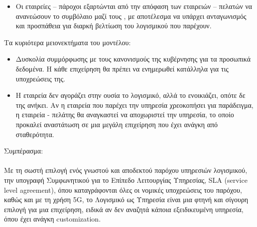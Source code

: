 \documentclass{article}
\begin{document}
\begin{itemize}
     SaaS, μια επιχείρηση έχει την ευκαιρία να αφοσιωθεί σε αυτό που την ενδιαφέρει πιο πολύ, την ποιότητα του προϊόντος της. Το ίδιο βέβαια ισχύει και για τους ιδιώτες. Αύξηση, λοιπόν, της καινοτομίας και της ευκινησίας (agility).
\item Οι εταιρείες – πάροχοι εξαρτώνται από την απόφαση των εταιρειών – πελατών να ανανεώσουν το συμβόλαιο μαζί τους , με αποτέλεσμα να υπάρχει ανταγωνισμός και προσπάθεια για διαρκή βελτίωση του λογισμικού που παρέχουν.
\end{itemize} 
Τα κυριότερα μειονεκτήματα του μοντέλου:
\begin{itemize}
  η χρήση Διαδικτύου, διαφορετικά δεν μπορεί να υπάρξει πρόσβαση στην εφαρμογή . Αντίθετα , με τον παραδοσιακό τρόπο του Λογισμικού ως Προϊόν , σε ορισμένες περιπτώσεις , ήταν εφικτό να γίνεται χρήση της εφαρμογής και χωρίς σύνδεση στο Διαδίκτυο . 
 ασφάλεια ευαίσθητων δεδομένων, αν δεν είναι έμπιστος ο πάροχος.
 ελέγχου, καθώς η υπηρεσία είναι έτοιμη για χρήση και δεν είναι εύκολο να μεταβληθεί και να προσαρμοστεί στις ανάγκες του κάθε χρήστη.
 ταχύτητα μετάδοσης της εφαρμογής, καθώς ο σέρβερ μπορεί να βρίσκεται σε μεγάλη απόσταση από το Browser, όπου τη χρησιμοποιεί ο χρήστης. Για αυτό είναι αναγκαία η επένδυση σε γρήγορη ταχύτητα Διαδικτύου.
\item Δυσκολία συμμόρφωσης με τους κανονισμούς της κυβέρνησης για τα προσωπικά δεδομένα. Η κάθε επιχείρηση θα πρέπει να ενημερωθεί κατάλληλα για τις υποχρεώσεις της.
\item Η εταιρεία δεν αγοράζει στην ουσία το λογισμικό, αλλά το ενοικιάζει, οπότε δε της ανήκει. Αν η εταιρεία που παρέχει την υπηρεσία χρεοκοπήσει για παράδειγμα, η εταιρεία - πελάτης θα αναγκαστεί να αποχωριστεί την υπηρεσία, το οποίο προκαλεί αναστάτωση σε μια μεγάλη επιχείρηση που έχει ανάγκη από σταθερότητα.

\end{itemize}
Συμπέρασμα: \\ \\
Με τη σωστή επιλογή ενός γνωστού και αποδεκτού παρόχου υπηρεσιών λογισμικού, την υπογραφή Συμφωνητικού για το Επίπεδο Λειτουργίας Υπηρεσίας, SLA (service level agreement), όπου καταγράφονται όλες οι νομικές υποχρεώσεις του παρόχου, καθώς και με τη χρήση  5G, το Λογισμικό ως Υπηρεσία είναι μια φτηνή και σίγουρη επιλογή για μια επιχείρηση, ειδικά αν δεν αναζητά κάποια εξειδικευμένη υπηρεσία, όπου έχει ανάγκη  customization.
\end{document}
